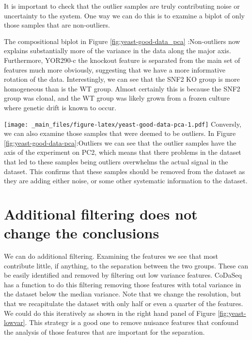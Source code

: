 \documentclass[onecolumn]{book}
\theoremstyle{definition}
\theoremstyle{definition}
\theoremstyle{definition}
\theoremstyle{remark}
\begin{document}
It is important to check that the outlier samples are truly contributing
noise or uncertainty to the system. One way we can do this is to examine
a biplot of only those samples that are non-outliers.

The compositional biplot in Figure \ref{fig:yeast-good-data_pca}
:Non-outliers now explains substantially more of the variance in the
data along the major axis. Furthermore, YOR290-c the knockout feature is
separated from the main set of features much more obviously, suggesting
that we have a more informative rotation of the data. Interestingly, we
can see that the SNF2 KO group is more homogeneous than is the WT group.
Almost certainly this is because the SNF2 group was clonal, and the WT
group was likely grown from a frozen culture where genetic drift is
known to occur.

\texttt{[image: \_main\_files/figure-latex/yeast-good-data-pca-1.pdf]}
Conversly, we can also examine those samples that were deemed to be
outliers. In Figure \ref{fig:yeast-good-data-pca}:Outliers we can see
that the outlier samples have the axis of the experiment on PC2, which
means that there problems in the dataset that led to these samples being
outliers overwhelms the actual signal in the dataset. This confirms that
these samples should be removed from the dataset as they are adding
either noise, or some other systematic information to the dataset.

\clearpage

\hypertarget{additional-filtering-does-not-change-the-conclusions}{%
\section{Additional filtering does not change the
conclusions}\label{additional-filtering-does-not-change-the-conclusions}}

We can do additional filtering. Examining the features we see that most
contribute little, if anything, to the separation between the two
groups. These can be easily identified and removed by filtering out low
variance features. CoDaSeq has a function to do this filtering removing
those features with total variance in the dataset below the median
variance. Note that we change the resolution, but that we recapitulate
the dataset with only half or even a quarter of the features. We could
do this iteratively as shown in the right hand panel of Figure
\ref{fig:yeast-lowvar}. This strategy is a good one to remove nuisance
features that confound the analysis of those features that are important
for the separation.
\end{document}
